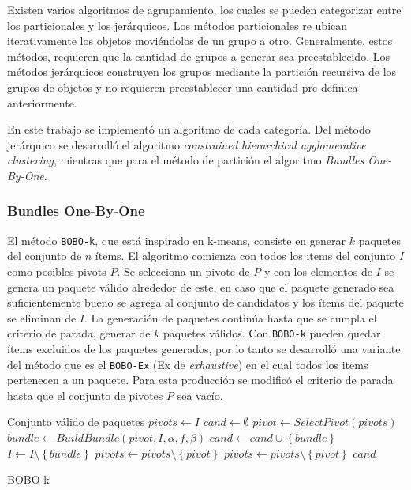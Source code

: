 Existen varios algoritmos de agrupamiento, los cuales se pueden categorizar entre los particionales y los jerárquicos. Los métodos particionales re ubican iterativamente los objetos moviéndolos de un grupo a otro. Generalmente, estos métodos, requieren que la cantidad de grupos a generar sea preestablecido. Los métodos jerárquicos construyen los grupos mediante la partición recursiva de los grupos de objetos y no requieren preestablecer una cantidad pre definica anteriormente.

En este trabajo se implementó un algoritmo de cada categoría. Del método jerárquico se desarrolló el algoritmo \textit{constrained hierarchical agglomerative clustering}, mientras que para el método de partición el algoritmo \textit{Bundles One-By-One}.

\subsubsection{Bundles One-By-One}
El método \texttt{BOBO-k}, que está inspirado en k-means, consiste en generar $k$ paquetes del conjunto de $n$ ítems. El algoritmo comienza con todos los items del conjunto $I$ como posibles pivots $P$. Se selecciona un pivote de $P$ y con los elementos de $I$ se genera un paquete válido alrededor de este, en caso que el paquete generado sea suficientemente bueno se agrega al conjunto de candidatos y los ítems del paquete se eliminan de $I$. La generación de paquetes continúa hasta que se cumpla el criterio de parada, generar de $k$ paquetes válidos. Con \texttt{BOBO-k} pueden quedar ítems excluidos de los paquetes generados, por lo tanto se desarrolló una variante del método que es el \texttt{BOBO-Ex} (Ex de \textit{exhaustive}) en el cual todos los items pertenecen a un paquete. Para esta producción se modificó el criterio de parada hasta que el conjunto de pivotes $P$ sea vacío.\\

\begin{algorithm}[H]
\begin{algorithmic}[1]
\ENSURE Conjunto válido de paquetes
\STATE $pivots \leftarrow I$
\STATE $cand \leftarrow \emptyset$
	\STATE $pivot \leftarrow SelectPivot(pivots)$
	\STATE $bundle \leftarrow BuildBundle(pivot,I,\alpha,f,\beta)$
		\STATE $cand \leftarrow cand \cup \left\{bundle\right\}$
		\STATE $I \leftarrow I \setminus \left\{bundle\right\}$
		\STATE $pivots \leftarrow pivots \setminus \left\{pivot\right\}$
	\ELSE
		\STATE $pivots \leftarrow pivots \setminus \left\{pivot\right\}$
	\ENDIF
\ENDWHILE
\RETURN $cand$
\end{algorithmic}
\caption{BOBO-k}\label{alg:bobo}
\end{algorithm}


